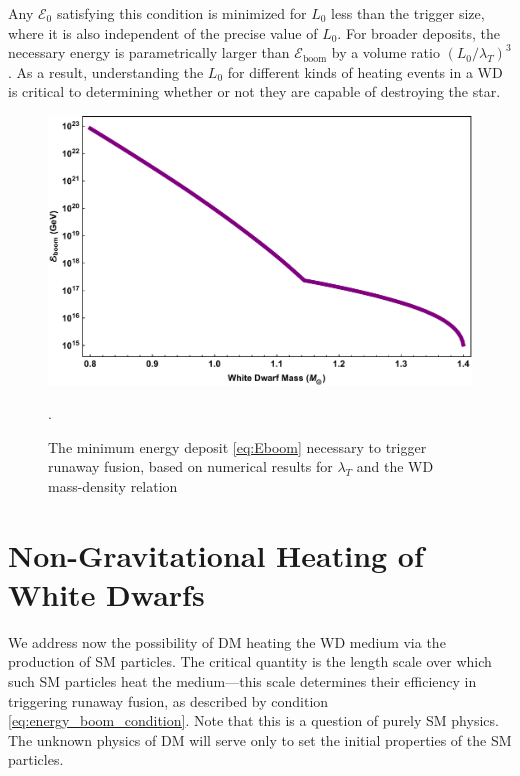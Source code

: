 \documentclass[twocolumn, preprintnumbers,amsmath,amssymb,prd, superscriptaddress]{revtex4}
\newcommand{\Ez}{\mathcal{E}_0}
\newcommand{\Eboom}{\mathcal{E}_\text{boom}}
\begin{document}
Any $\Ez$ satisfying this condition is minimized for $L_0$ less than the trigger size, where it is also independent of the precise value of $L_0$.
For broader deposits, the necessary energy is parametrically larger than $\Eboom$ by a volume ratio $(L_0/\lambda_T)^3$.
As a result, understanding the $L_0$ for different kinds of heating events in a WD is critical to determining whether or not they are capable of destroying the star.
\begin{figure}
\includegraphics[scale=.3]{Eboom.pdf}
\caption{The minimum energy deposit \eqref{eq:Eboom} necessary to trigger runaway fusion, based on numerical results for $\lambda_T$ \cite{Woosley} and the WD mass-density relation \cite{cococubed}}.
\label{fig:Eboom}
\end{figure}

\section{Non-Gravitational Heating of White Dwarfs}
\label{sec:SMHeating}

We address now the possibility of DM heating the WD medium via the production of SM particles.
The critical quantity is the length scale over which such SM particles heat the medium---this scale determines their efficiency in triggering runaway fusion, as described by condition \eqref{eq:energy_boom_condition}.
Note that this is a question of purely SM physics.
The unknown physics of DM will serve only to set the initial properties of the SM particles.
\end{document}
